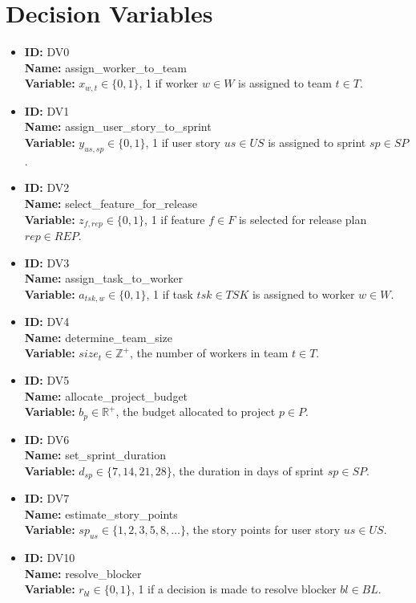 \documentclass[11pt]{article}
\begin{document}
\section{Decision Variables}
\begin{itemize}
    \item \textbf{ID:} DV0 \\ \textbf{Name:} assign\_worker\_to\_team \\
    \textbf{Variable:} $x_{w,t} \in \{0, 1\}$, 1 if worker $w \in W$ is assigned to team $t \in T$.

    \item \textbf{ID:} DV1 \\ \textbf{Name:} assign\_user\_story\_to\_sprint \\
    \textbf{Variable:} $y_{us,sp} \in \{0, 1\}$, 1 if user story $us \in US$ is assigned to sprint $sp \in SP$.

    \item \textbf{ID:} DV2 \\ \textbf{Name:} select\_feature\_for\_release \\
    \textbf{Variable:} $z_{f,rep} \in \{0, 1\}$, 1 if feature $f \in F$ is selected for release plan $rep \in REP$.

    \item \textbf{ID:} DV3 \\ \textbf{Name:} assign\_task\_to\_worker \\
    \textbf{Variable:} $a_{tsk,w} \in \{0, 1\}$, 1 if task $tsk \in TSK$ is assigned to worker $w \in W$.

    \item \textbf{ID:} DV4 \\ \textbf{Name:} determine\_team\_size \\
    \textbf{Variable:} $size_t \in \mathbb{Z}^+$, the number of workers in team $t \in T$.

    \item \textbf{ID:} DV5 \\ \textbf{Name:} allocate\_project\_budget \\
    \textbf{Variable:} $b_p \in \mathbb{R}^+$, the budget allocated to project $p \in P$.

    \item \textbf{ID:} DV6 \\ \textbf{Name:} set\_sprint\_duration \\
    \textbf{Variable:} $d_{sp} \in \{7, 14, 21, 28\}$, the duration in days of sprint $sp \in SP$.

    \item \textbf{ID:} DV7 \\ \textbf{Name:} estimate\_story\_points \\
    \textbf{Variable:} $sp_{us} \in \{1, 2, 3, 5, 8, \dots\}$, the story points for user story $us \in US$.

    \item \textbf{ID:} DV10 \\ \textbf{Name:} resolve\_blocker \\
    \textbf{Variable:} $r_{bl} \in \{0, 1\}$, 1 if a decision is made to resolve blocker $bl \in BL$.

\end{itemize}
\end{document}
